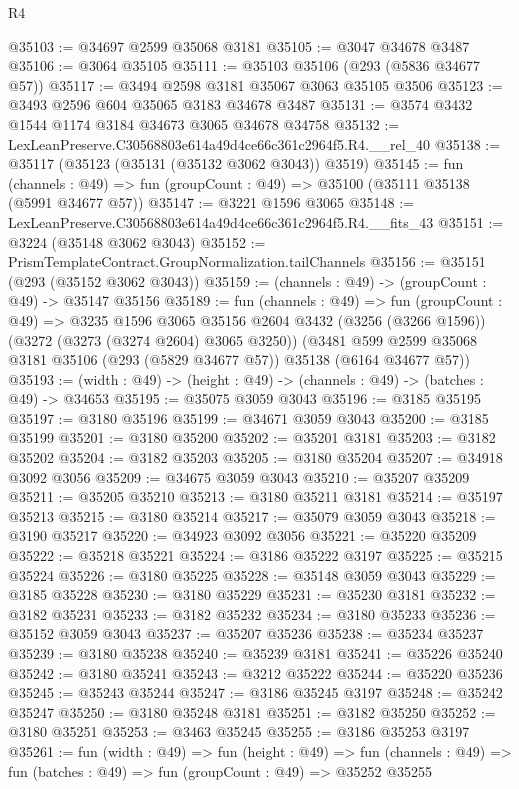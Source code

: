 \begin{lexlean}{R4}
\begin{coremodule}
@35103 := @34697 @2599 @35068 @3181
@35105 := @3047 @34678 @3487
@35106 := @3064 @35105
@35111 := @35103 @35106 (@293 (@5836 @34677 @57))
@35117 := @3494 @2598 @3181 @35067 @3063 @35105 @3506
@35123 := @3493 @2596 @604 @35065 @3183 @34678 @3487
@35131 := @3574 @3432 @1544 @1174 @3184 @34673 @3065 @34678 @34758
@35132 := LexLeanPreserve.C30568803e614a49d4ce66c361c2964f5.R4.__rel_40
@35138 := @35117 (@35123 (@35131 (@35132 @3062 @3043)) @3519)
@35145 := fun (channels : @49) =>
  fun (groupCount : @49) => @35100 (@35111 @35138 (@5991 @34677 @57))
@35147 := @3221 @1596 @3065
@35148 := LexLeanPreserve.C30568803e614a49d4ce66c361c2964f5.R4.__fits_43
@35151 := @3224 (@35148 @3062 @3043)
@35152 := PrismTemplateContract.GroupNormalization.tailChannels
@35156 := @35151 (@293 (@35152 @3062 @3043))
@35159 := (channels : @49) -> (groupCount : @49) -> @35147 @35156
@35189 := fun (channels : @49) =>
  fun (groupCount : @49) =>
  @3235
    @1596
    @3065
    @35156
    @2604
    @3432
    (@3256 (@3266 @1596))
    (@3272 (@3273 (@3274 @2604) @3065 @3250))
    (@3481 @599 @2599 @35068 @3181 @35106 (@293 (@5829 @34677 @57)) @35138 (@6164 @34677 @57))
@35193 := (width : @49) -> (height : @49) -> (channels : @49) -> (batches : @49) -> @34653
@35195 := @35075 @3059 @3043
@35196 := @3185 @35195
@35197 := @3180 @35196
@35199 := @34671 @3059 @3043
@35200 := @3185 @35199
@35201 := @3180 @35200
@35202 := @35201 @3181
@35203 := @3182 @35202
@35204 := @3182 @35203
@35205 := @3180 @35204
@35207 := @34918 @3092 @3056
@35209 := @34675 @3059 @3043
@35210 := @35207 @35209
@35211 := @35205 @35210
@35213 := @3180 @35211 @3181
@35214 := @35197 @35213
@35215 := @3180 @35214
@35217 := @35079 @3059 @3043
@35218 := @3190 @35217
@35220 := @34923 @3092 @3056
@35221 := @35220 @35209
@35222 := @35218 @35221
@35224 := @3186 @35222 @3197
@35225 := @35215 @35224
@35226 := @3180 @35225
@35228 := @35148 @3059 @3043
@35229 := @3185 @35228
@35230 := @3180 @35229
@35231 := @35230 @3181
@35232 := @3182 @35231
@35233 := @3182 @35232
@35234 := @3180 @35233
@35236 := @35152 @3059 @3043
@35237 := @35207 @35236
@35238 := @35234 @35237
@35239 := @3180 @35238
@35240 := @35239 @3181
@35241 := @35226 @35240
@35242 := @3180 @35241
@35243 := @3212 @35222
@35244 := @35220 @35236
@35245 := @35243 @35244
@35247 := @3186 @35245 @3197
@35248 := @35242 @35247
@35250 := @3180 @35248 @3181
@35251 := @3182 @35250
@35252 := @3180 @35251
@35253 := @3463 @35245
@35255 := @3186 @35253 @3197
@35261 := fun (width : @49) =>
  fun (height : @49) =>
  fun (channels : @49) => fun (batches : @49) => fun (groupCount : @49) => @35252 @35255

\end{coremodule}
\end{lexlean}
